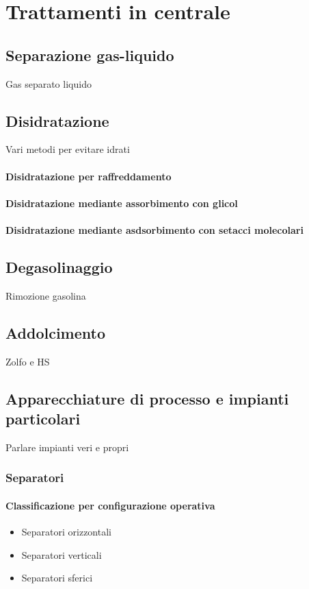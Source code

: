 \section{Trattamenti in centrale}
\subsection{Separazione gas-liquido}
Gas separato liquido

\subsection{Disidratazione}
Vari metodi per evitare idrati
\paragraph{Disidratazione per raffreddamento}
\paragraph{Disidratazione mediante assorbimento con glicol}
\paragraph{Disidratazione mediante asdsorbimento con setacci molecolari}

\subsection{Degasolinaggio}
Rimozione gasolina

\subsection{Addolcimento}
Zolfo e HS

\subsection{Apparecchiature di processo e impianti particolari}
Parlare impianti veri e propri

\subsubsection{Separatori}
\paragraph{Classificazione per configurazione operativa}
\begin{itemize}
\item Separatori orizzontali
\item Separatori verticali
\item Separatori sferici
\end{itemize}


